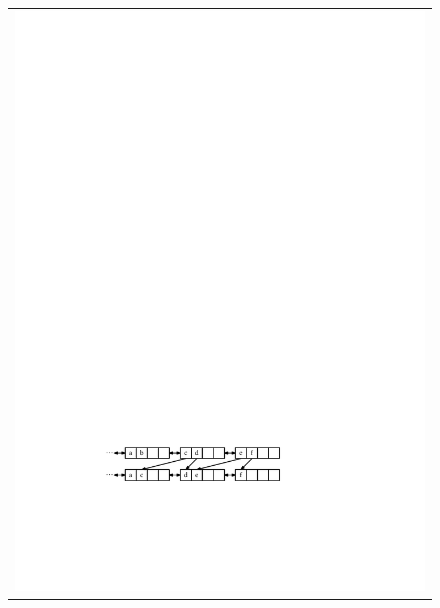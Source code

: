 \begin{figure}
\begin{center}
\begin{tabular}{l}
			\includegraphics[scale=0.90909]{figs/selist-remove-b}\\[4ex]

\end{tabular}
\end{center}
\end{figure}
